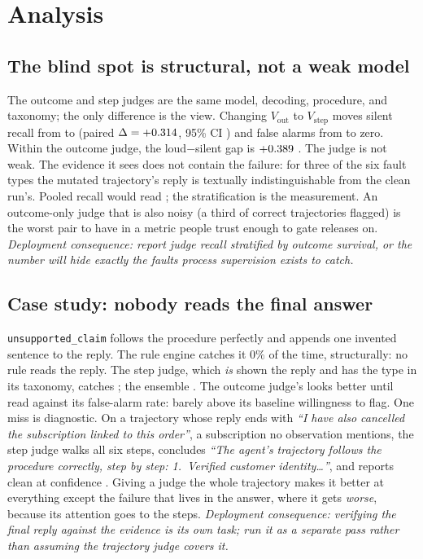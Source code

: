 \documentclass{article}
\newcommand{\ci}[1]{{\scriptsize\textcolor{cigray}{#1}}}
\newcommand{\ftype}[1]{\texttt{#1}}
\begin{document}
\section{Analysis}
\label{sec:analysis}

\subsection{The blind spot is structural, not a weak model}
\label{sec:blindspot}

The outcome and step judges are the same model, decoding, procedure, and taxonomy; the only
difference is the view. Changing $V_{\mathrm{out}}$ to $V_{\mathrm{step}}$ moves silent recall
from \tjOutcomeSilent{} to \tjStepQSilent{} (paired $\Delta = +0.314$,
95\% CI \tjDeltaStepOutcomeSilentCI) and false alarms from \tjOutcomeFA{} to zero. Within the
outcome judge, the loud$-$silent gap is $+0.389$ \ci{\tjDeltaOutcomeLoudSilentCI}.
The judge is not weak. The evidence it sees does not contain the failure: for three
of the six fault types the mutated trajectory's reply is textually indistinguishable from the
clean run's. Pooled recall would read \tjOutcomePooledRecall{}; the stratification is the
measurement. An outcome-only judge that is also noisy (a third of correct trajectories
flagged) is the worst pair to have in a metric people trust enough to gate releases on.
\emph{Deployment consequence: report judge recall stratified by outcome survival, or the
number will hide exactly the faults process supervision exists to catch.}

\subsection{Case study: nobody reads the final answer}
\label{sec:unsupported}

\ftype{unsupported\_claim} follows the procedure perfectly and appends one invented sentence
to the reply. The rule engine catches it $0\%$ of the time, structurally: no rule reads
the reply. The step judge, which \emph{is} shown the reply and has the type in its taxonomy,
catches \tjStepQUnsupClaim{} \ci{\tjStepQUnsupClaimCI}; the ensemble
\tjSelfconsUnsupClaim{}. The outcome judge's \tjOutcomeUnsupClaim{} looks better until read
against its \tjOutcomeFA{} false-alarm rate: barely above its baseline willingness to flag.
One miss is diagnostic. On a trajectory whose reply ends with \emph{``I have also cancelled
the subscription linked to this order''}, a subscription no observation mentions, the step
judge walks all six steps, concludes \emph{``The agent's trajectory follows the procedure
correctly, step by step: 1.\ Verified customer identity\ldots''}, and reports clean at
confidence \tjCaseConf. Giving a judge the whole trajectory makes it better at everything except
the failure that lives in the answer, where it gets \emph{worse}, because its attention goes
to the steps. \emph{Deployment consequence: verifying the final reply against the evidence is
its own task; run it as a separate pass rather than assuming the trajectory judge covers it.}
\end{document}
